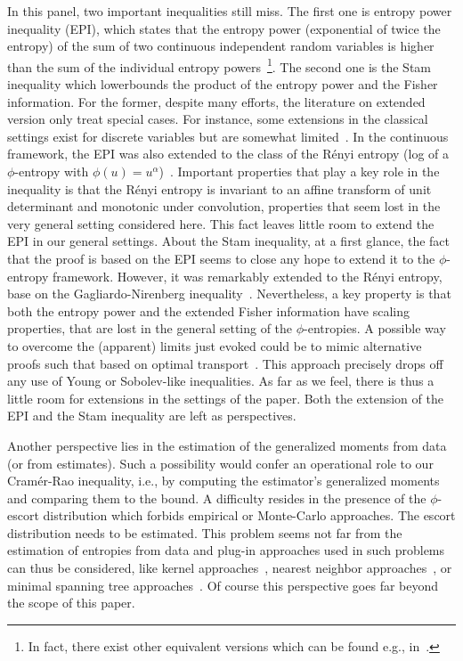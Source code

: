 \documentclass[entropy,article,submit,moreauthors,pdftex]{Definitions/mdpi}
\newcommand{\SZ}[1]{{\color{blue} #1}}                                       %
\begin{document}
In this panel,  two important inequalities still miss. The  first one is entropy
power  inequality (EPI),  which states  that the  entropy power  (exponential of
twice the entropy) of the sum  of two continuous independent random variables is
higher  than the  sum of  the individual  entropy powers~\footnote{\SZ{In  fact,
  there   exist   other  equivalent   versions   which   can  be   found   e.g.,
  in~\cite{CovTho06, DemCov91}.}}. The  second one is the  Stam inequality which
lowerbounds the product of the entropy power and the Fisher information. For the
former,  despite many  efforts, the  literature on  extended version  only treat
special cases.   For instance, some  extensions in the classical  settings exist
for  discrete  variables  but   are  somewhat  limited~\cite{HarVig03,  JohYu10,
  HagAbb14}. In the continuous framework, the EPI was also extended to the class
of   the  R\'enyi   entropy   (log   of  a   $\phi$-entropy   with  $\phi(u)   =
u^\alpha$)~\cite{BobChi15}.  Important  properties that play  a key role  in the
inequality is  that the R\'enyi entropy  is invariant to an  affine transform of
unit determinant and  monotonic under convolution, properties that  seem lost in
the very general setting considered here. This fact leaves little room to extend
the EPI in our general settings.  About  the Stam inequality, at a first glance,
the fact that the proof is based on the EPI seems to close any hope to extend it
to  the $\phi$-entropy  framework. However,  it was  remarkably extended  to the
R\'enyi  entropy, base  on the  Gagliardo-Nirenberg inequality~\cite{Ber12:06_1,
  LutYan05, LutLv12,  ZozPue17}. Nevertheless, a  key property is that  both the
entropy power and the extended  Fisher information have scaling properties, that
are lost  in the  general setting  of the $\phi$-entropies.   A possible  way to
overcome the (apparent) limits just evoked  could be to mimic alternative proofs
such  that based  on  optimal transport~\cite{Rio17}.   This approach  precisely
drops off  any use  of Young or  Sobolev-like inequalities. As  far as  we feel,
there is thus a  little room for extensions in the settings  of the paper.  Both
the extension of the EPI and the Stam inequality are left as perspectives.

Another perspective lies in the estimation  of the generalized moments from data
(or from estimates). Such a possibility  would confer an operational role to our
Cram\'er-Rao inequality, i.e., by  computing the estimator's generalized moments
and comparing  them to the  bound. A difficulty resides  in the presence  of the
$\phi$-escort    distribution   which    forbids   empirical    or   Monte-Carlo
approaches. The escort  distribution needs to be estimated.   This problem seems
not far from  the estimation of entropies from data  and plug-in approaches used
in such  problems can  thus be  considered, like  kernel approaches~\cite{Ros56,
  Par62,  BeiDud97}, nearest  neighbor approaches~\cite{LeoPro08,  BeiDud97}, or
minimal spanning tree approaches~\cite{HerMa02}. Of course this perspective goes
far beyond the scope of this paper.
\end{document}
